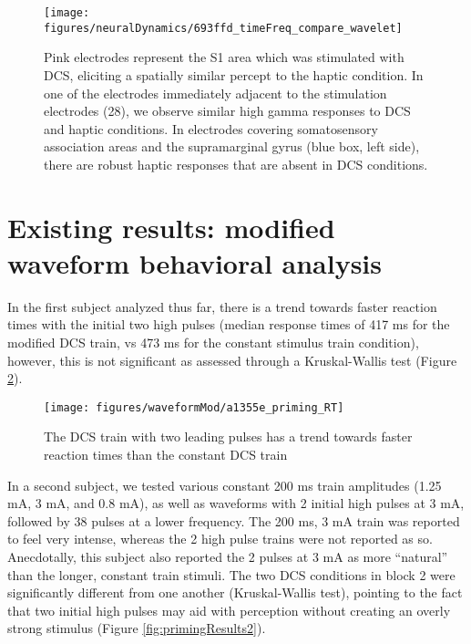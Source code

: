 \begin{figure}[ht]
	\centering
	\texttt{[image: figures/neuralDynamics/693ffd\_timeFreq\_compare\_wavelet]}
	\caption[Example analysis highlighting the similarities and differences in the time and frequency domain from both haptic and DCS conditions.]{Pink electrodes represent the S1 area which was stimulated with DCS, eliciting a spatially similar percept to the haptic condition. In one of the electrodes immediately adjacent to the stimulation electrodes (28), we observe similar high gamma responses to DCS and haptic conditions. In electrodes covering somatosensory association areas and the supramarginal gyrus (blue box, left side), there are robust haptic responses that are absent in DCS conditions. }
	\label{fig:693ffd_timeFreq}
\end{figure}

\section{Existing results: modified waveform behavioral analysis}

In the first subject analyzed thus far, there is a trend towards faster reaction times with the initial two high pulses (median response times of 417 ms for the modified DCS train, vs 473 ms for the constant stimulus train condition), however, this is not significant as assessed through a Kruskal-Wallis test (Figure \ref{fig:primingResults1}). 

\begin{figure}[ht]
	\centering
	\texttt{[image: figures/waveformMod/a1355e\_priming\_RT]}
	\caption[Modified waveform - first subject]{The DCS train with two leading pulses has a trend towards faster reaction times than the constant DCS train}
	\label{fig:primingResults1}
\end{figure}

In a second subject, we tested various constant 200 ms train amplitudes (1.25 mA, 3 mA, and 0.8 mA), as well as waveforms with 2 initial high pulses at 3 mA, followed by 38 pulses at a lower frequency. The 200 ms, 3 mA train was reported to feel very intense, whereas the 2 high pulse trains were not reported as so. Anecdotally, this subject also reported the 2 pulses at 3 mA as more “natural” than the longer, constant train stimuli. The two DCS conditions in block 2 were significantly different from one another (Kruskal-Wallis test), pointing to the fact that two initial high pulses may aid with perception without creating an overly strong stimulus (Figure \ref{fig:primingResults2}). 

